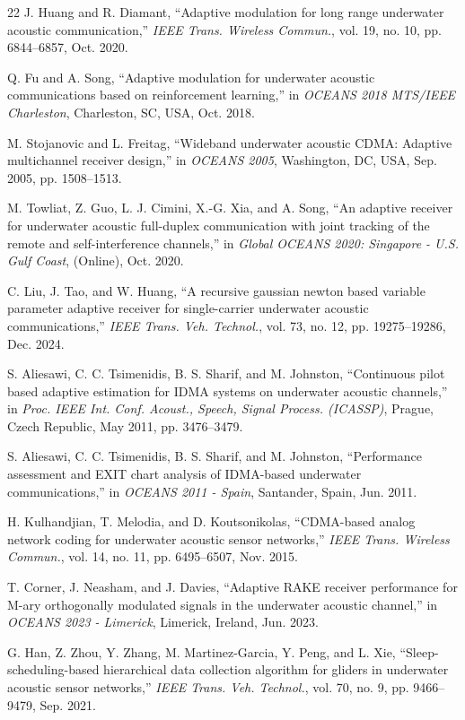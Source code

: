 \documentclass[lettersize,journal]{IEEEtran}
\begin{document}
\begin{thebibliography}{22}
J. Huang and R. Diamant, ``Adaptive modulation for long range underwater acoustic communication,'' \textit{IEEE Trans. Wireless Commun.}, vol. 19, no. 10, pp. 6844--6857, Oct. 2020.

Q. Fu and A. Song, ``Adaptive modulation for underwater acoustic communications based on reinforcement learning,'' in \textit{OCEANS 2018 MTS/IEEE Charleston}, Charleston, SC, USA, Oct. 2018.

M. Stojanovic and L. Freitag, ``Wideband underwater acoustic CDMA: Adaptive multichannel receiver design,'' in \textit{OCEANS 2005}, Washington, DC, USA, Sep. 2005, pp. 1508--1513.

M. Towliat, Z. Guo, L. J. Cimini, X.-G. Xia, and A. Song, ``An adaptive receiver for underwater acoustic full-duplex communication with joint tracking of the remote and self-interference channels,'' in \textit{Global OCEANS 2020: Singapore - U.S. Gulf Coast}, (Online), Oct. 2020.

C. Liu, J. Tao, and W. Huang, ``A recursive gaussian newton based variable parameter adaptive receiver for single-carrier underwater acoustic communications,'' \textit{IEEE Trans. Veh. Technol.}, vol. 73, no. 12, pp. 19275--19286, Dec. 2024.


S. Aliesawi, C. C. Tsimenidis, B. S. Sharif, and M. Johnston, ``Continuous pilot based adaptive estimation for IDMA systems on underwater acoustic channels,'' in \textit{Proc. IEEE Int. Conf. Acoust., Speech, Signal Process. (ICASSP)}, Prague, Czech Republic, May 2011, pp. 3476--3479.

S. Aliesawi, C. C. Tsimenidis, B. S. Sharif, and M. Johnston, ``Performance assessment and EXIT chart analysis of IDMA-based underwater communications,'' in \textit{OCEANS 2011 - Spain}, Santander, Spain, Jun. 2011.

H. Kulhandjian, T. Melodia, and D. Koutsonikolas, ``CDMA-based analog network coding for underwater acoustic sensor networks,'' \textit{IEEE Trans. Wireless Commun.}, vol. 14, no. 11, pp. 6495--6507, Nov. 2015.


T. Corner, J. Neasham, and J. Davies, ``Adaptive RAKE receiver performance for M-ary orthogonally modulated signals in the underwater acoustic channel,'' in \textit{OCEANS 2023 - Limerick}, Limerick, Ireland, Jun. 2023.


G. Han, Z. Zhou, Y. Zhang, M. Martinez-Garcia, Y. Peng, and L. Xie, ``Sleep-scheduling-based hierarchical data collection algorithm for gliders in underwater acoustic sensor networks,'' \textit{IEEE Trans. Veh. Technol.}, vol. 70, no. 9, pp. 9466--9479, Sep. 2021.



\end{thebibliography}
\end{document}
